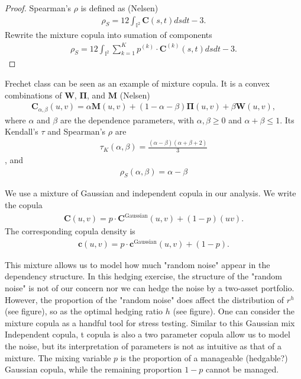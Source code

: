 \begin{proof}
    Spearman's $\rho$ is defined as (Nelsen)
    \begin{align}
        \rho_S = 12 \int_{\mathbb{I}^2} \bm{C}(s,t) ds dt - 3.
        \end{align}
    Rewrite the mixture copula into sumation of components
       \begin{align}
        \rho_S = 12 \int_{\mathbb{I}^2} \sum_{k=1}^K p^{(k)} \cdot \bm{C}^{(k)}(s,t) ds dt - 3.
        \end{align}
    \end{proof}
\begin{example}
    Frechet class can be seen as an example of mixture copula.
    It is a convex combinations of $\bm{W}$, $\bm{\Pi}$, and $\bm{M}$ (Nelsen)
    \begin{align}
        \bm{C}_{\alpha, \beta}(u,v)
        = \alpha \bm{M}(u,v) +
        (1-\alpha-\beta)\bm{\Pi}(u,v)
        +\beta \bm{W}(u,v),
        \end{align}
    where $\alpha$ and $\beta$ are the dependence parameters, with $\alpha, \beta \geq 0$ and
    $\alpha+\beta \leq 1$.
    Its Kendall's $\tau$ and Spearman's $\rho$ are
    \begin{align}
        \tau_K(\alpha, \beta) = \frac{(\alpha - \beta)(\alpha+\beta+2)}{3}
        \end{align}
    , and
    \begin{align}
        \rho_S(\alpha, \beta) = \alpha - \beta
        \end{align}
    \end{example}\medskip

We use a mixture of Gaussian and independent copula in our analysis.
We write the copula
\begin{align}
    \bm{C}(u,v) = p\cdot \bm{C}^\text{Gaussian}(u,v) + (1-p)(uv).
    \end{align}
The corresponding copula density is
\begin{align}
    \bm{c}(u,v) = p\cdot \bm{c}^\text{Gaussian}(u,v) + (1-p).
    \end{align}

This mixture allows us to model how much "random noise" appear in the dependency structure.
In this hedging exercise, the structure of the "random noise" is not of our concern nor we can
hedge the noise by a two-asset portfolio.
However, the proportion of the "random noise" does affect the distribution of $r^h$ (see figure),
so as the optimal hedging ratio $h$ (see figure).
One can consider the mixture copula as a handful tool for stress testing.
Similar to this Gaussian mix Independent copula,
t copula is also a two parameter copula allow us to model the noise,
but its interpretation of parameters is not as intuitive as that of a mixture.
The mixing variable $p$ is the proportion of a manageable (hedgable?) Gaussian copula,
while the remaining proportion $1-p$ cannot be managed.

